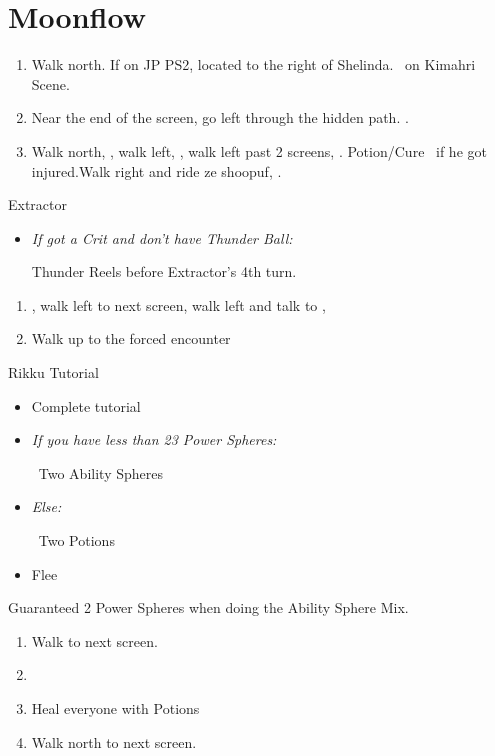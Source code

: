 \chapter{Moonflow}

\begin{enumerate}
	\item Walk north. If on JP PS2,  located to the right of Shelinda. \sd\ on Kimahri Scene.
	\item Near the end of the screen, go left through the hidden path. .
	\item Walk north, \sd, walk left, \sd, walk left past 2 screens, \sd.  Potion/Cure \tidus\ if he got injured.Walk right and ride ze shoopuf, \sd.
\end{enumerate}
\begin{battle}[4000]{Extractor}
	\begin{itemize}
		\tidusf Haste self, then \wakka
		\wakkaf Attack
		\tidusf \textit{If Lightning Steel:}
		\begin{itemize}
			\item Cheer x1
		\end{itemize}
		\textit{Else:}
		\begin{itemize}
			\item Cheer x4
		\end{itemize}
		\tidusf Attack
		\item \textit{If got a Crit and don't have Thunder Ball:}
		\begin{itemize}
			\wakkaf \od Thunder Reels before Extractor's 4th turn.
		\end{itemize}
	\end{itemize}
\end{battle}
\begin{enumerate}[resume]
	\item \sd, walk left to next screen, walk left and talk to \rikku, \sd
	\item Walk up to the forced encounter
\end{enumerate}
\begin{battle}{Rikku Tutorial}
	\begin{itemize}
		\item Complete tutorial
		\item \textit{If you have less than 23 Power Spheres:}
		      \begin{itemize}
			      \rikkuf \od\ Two Ability Spheres
		      \end{itemize}
		\item \textit{Else:}
		      \begin{itemize}
			      \rikkuf \od\ Two Potions
		      \end{itemize}
		\item Flee
	\end{itemize}
Guaranteed 2 Power Spheres when doing the Ability Sphere Mix.
\end{battle}
\begin{enumerate}[resume]
	\item Walk to next screen.
	\item \formation{\tidus}{\wakka}{\auron}
	\item Heal everyone with Potions
	\item Walk north to next screen.
\end{enumerate}